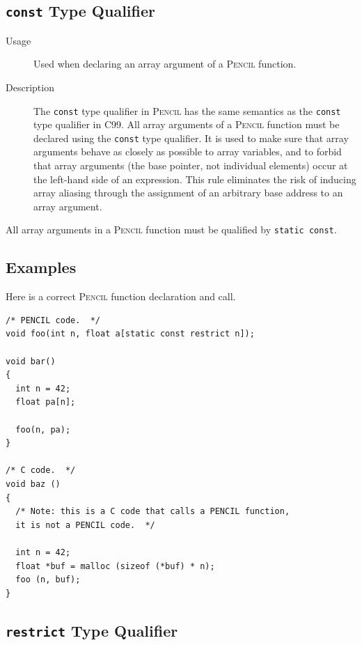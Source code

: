\documentclass{carp}
\newcommand\pencil{\textsc{Pencil}\xspace}
\begin{document}
\subsection{\lstinline!const! Type Qualifier}
\label{sec:const}

\begin{description}
\item [Usage] Used when declaring an array argument of a \pencil function.
\item [Description] The \lstinline!const! type qualifier in \pencil
has the same semantics as the \lstinline!const! type qualifier in C99.
All array arguments of a \pencil function
must be declared using the \lstinline!const! type qualifier.
It is used to make sure that array arguments behave as closely as possible to
array variables, and to forbid that array arguments (the base
pointer, not individual elements) occur at the left-hand side of an
expression.  This rule eliminates the risk of inducing array aliasing
through the assignment of an arbitrary base address to an array
argument.
\end{description}

All array arguments in a \pencil function must be
qualified by \lstinline!static const!.

\subsection*{Examples}

Here is a correct \pencil function declaration and call.

\begin{lstlisting}[language=pencil]
/* PENCIL code.  */
void foo(int n, float a[static const restrict n]);

void bar()
{
  int n = 42;
  float pa[n];

  foo(n, pa);
}

/* C code.  */
void baz ()
{
  /* Note: this is a C code that calls a PENCIL function,
  it is not a PENCIL code.  */

  int n = 42;
  float *buf = malloc (sizeof (*buf) * n);
  foo (n, buf);
}
\end{lstlisting}

\subsection{\lstinline!restrict! Type Qualifier}
\label{sec:restrict}

\end{document}
